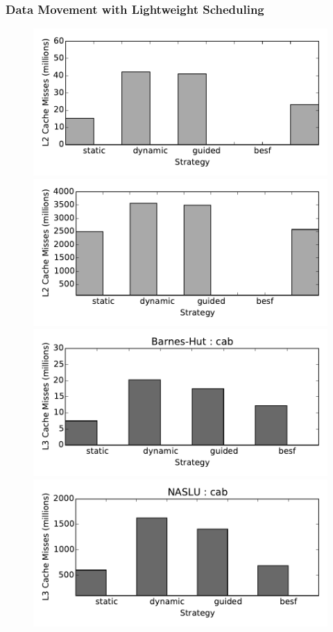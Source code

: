 \begin{frame}      
\frametitle{Data Movement with Lightweight Scheduling}
\begin{figure}[t]
\label{fig:cacheMisses-cab} 
\begin{center}   
\includegraphics[scale=0.30]{plots/L2-CacheMisses-nbody-cab-withbesf}
\includegraphics[scale=0.30]{plots/L2-CacheMisses-NASLU-cab-withbesf}\\  
\includegraphics[scale=0.30]{plots/L3-CacheMisses-nbody-cab-withbesf} 
\includegraphics[scale=0.30]{plots/L3-CacheMisses-NASLU-cab-withbesf}

\end{center}
\end{figure}
\end{frame}
